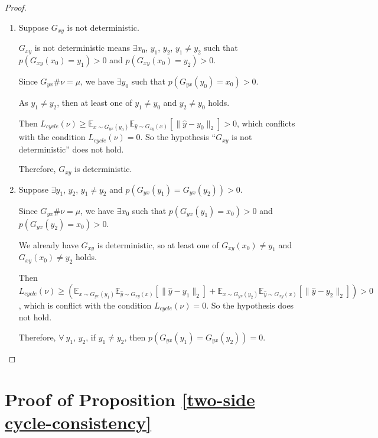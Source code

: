 \documentclass[runningheads]{llncs}
\begin{document}
\begin{proof}  $ $ \\
	\vspace{-10pt}
	\begin{enumerate}
		
		\item Suppose $G_{xy}$ is not deterministic.
		
		
		$G_{xy}$ is not deterministic means $\exists x_0$, $y_1$, $y_2$, $y_1 \neq y_2$ such that $p(G_{xy}(x_0) = y_1) > 0$ and $p(G_{xy}(x_0) = y_2) > 0$. 		
		
		Since $G_{yx}\#\nu = \mu$, we have $\exists y_0$ such that $p(G_{yx}(y_0)=x_0) > 0$. 		
		
		
		As $y_1 \neq y_2$, then at least one of $y_1 \neq y_0$ and $y_2 \neq y_0$ holds. 
		
		Then $L_{cycle}(\nu) \geq \mathbb{E}_{x \sim G_{yx}(y_0)}\mathbb{E}_{\hat{y} \sim G_{xy}(x)} [\|\hat{y} - y_0\|_2] > 0$, which conflicts with the condition $L_{cycle}(\nu) = 0$. 		
		So the hypothesis ``$G_{xy}$ is not deterministic'' does not hold.
		
		Therefore, $G_{xy}$ is deterministic. 
		
		\item Suppose $\exists y_1$, $y_2$, $y_1 \neq y_2$ and $p(G_{yx}(y_1)=G_{yx}(y_2)) > 0$. 
		
		Since $G_{yx}\#\nu = \mu$, we have $\exists x_0$ such that $p(G_{yx}(y_1)=x_0) > 0$ and $p(G_{yx}(y_2)=x_0) > 0$. 	
		
		We already have $G_{xy}$ is deterministic, so at least one of $G_{xy}(x_0) \neq y_1$ and $G_{xy}(x_0) \neq y_2$ holds. 	
		
		Then $L_{cycle}(\nu) \geq (\mathbb{E}_{x \sim G_{yx}(y_1)}\mathbb{E}_{\hat{y} \sim G_{xy}(x)} [\|\hat{y} - y_1\|_2] + \mathbb{E}_{x \sim G_{yx}(y_2)}\mathbb{E}_{\hat{y} \sim G_{xy}(x)} [\|\hat{y} - y_2\|_2]) > 0$, which is conflict with the condition $L_{cycle}(\nu) = 0$. 			
		So the hypothesis does not hold. 
		
		Therefore, $\forall ~ y_1$, $y_2$, if $y_1 \neq y_2$, then $p(G_{yx}(y_1)=G_{yx}(y_2))=0$. 
	\end{enumerate}
\end{proof}

\section{Proof of Proposition \ref{two-side cycle-consistency}}
\end{document}
